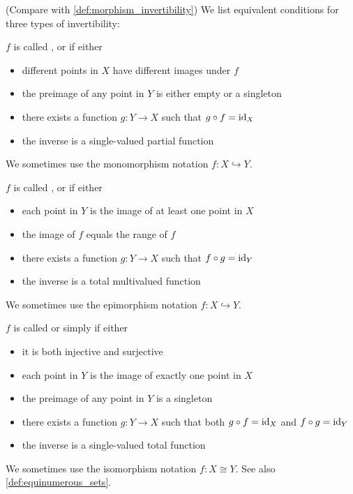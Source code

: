 \begin{definition}\label{def:function_invertibility}(Compare with \cref{def:morphism_invertibility})
  We list equivalent conditions for three types of invertibility:
  \begin{defenum}
     \( f \) is called ,  or  if either
    \begin{itemize}
      \item different points in \( X \) have different images under \( f \)
      \item the preimage of any point in \( Y \) is either empty or a singleton
      \item there exists a function \( g: Y \to X \) such that \( g \circ f = \operatorname{id}_X \)
      \item the inverse is a single-valued partial function
    \end{itemize}

    We sometimes use the monomorphism notation \( f: X \hookrightarrow Y \).

     \( f \) is called ,  or  if either
    \begin{itemize}
      \item each point in \( Y \) is the image of at least one point in \( X \)
      \item the image of \( f \) equals the range of \( f \)
      \item there exists a function \( g: Y \to X \) such that \( f \circ g = \operatorname{id}_Y \)
      \item the inverse is a total multivalued function
    \end{itemize}

    We sometimes use the epimorphism notation \( f: X \hookrightarrow Y \).

     \( f \) is called  or simply  if either
    \begin{itemize}
      \item it is both injective and surjective
      \item each point in \( Y \) is the image of exactly one point in \( X \)
      \item the preimage of any point in \( Y \) is a singleton
      \item there exists a function \( g: Y \to X \) such that both \( g \circ f = \operatorname{id}_X \) and \( f \circ g = \operatorname{id}_Y \)
      \item the inverse is a single-valued total function
    \end{itemize}

    We sometimes use the isomorphism notation \( f: X \cong Y \). See also \cref{def:equinumerous_sets}.
  \end{defenum}
\end{definition}

